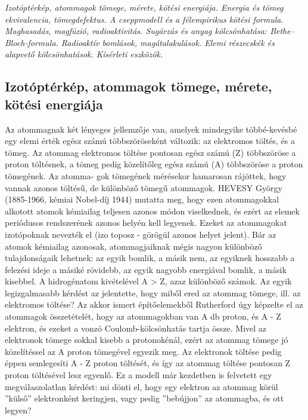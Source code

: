 \documentclass[../main.tex]{subfiles}
\begin{document}
\textit{Izotóptérkép, atommagok tömege, mérete, kötési energiája. Energia és tömeg ekvivalencia, tömegdefektus. A cseppmodell és a félempirikus kötési formula.
Maghasadás, magfúzió, radioaktivitás. Sugárzás és anyag kölcsönhatása: Bethe–Bloch-formula. Radioaktív bomlások, magátalakulások. Elemi részecskék és alapvető kölcsönhatások. Kísérleti eszközök.}

\subsection{Izotóptérkép, atommagok tömege, mérete, kötési energiája}
Az atommagnak két lényeges jellemzője van, amelyek mindegyike többé-kevésbé egy elemi érték egész számú többszöröseként változik: az elektromos töltés, és a tömeg. Az
atommag elektromos töltése pontosan egész számú (Z) többszöröse a proton töltésnek,
a tömeg pedig közelítőleg egész számú (A) többszöröse a proton tömegének. Az atomma-
gok tömegének mérésekor hamarosan rájöttek, hogy vannak azonos töltésű, de különböző
tömegű atommagok. HEVESY György (1885-1966, kémiai Nobel-díj 1944) mutatta meg,
hogy ezen atommagokkal alkotott atomok kémiailag teljesen azonos módon viselkednek,
és ezért az elemek periódusos rendszerének azonos helyén kell legyenek. Ezeket az atommagokat izotópoknak nevezték el (izo toposz - görögül azonos helyet jelent). Bár az
atomok kémiailag azonosak, atommagjaiknak mégis nagyon különböző tulajdonságaik
lehetnek: az egyik bomlik, a másik nem, az egyiknek hosszabb a felezési ideje a másiké rövidebb, az egyik nagyobb energiával bomlik, a másik kisebbel. A hidrogénatom
kivételével A > Z, azaz különböző számok. Az egyik legizgalmasabb kérdést az jelentette, hogy miből ered az atommag tömege, ill. az elektromos töltése? Az akkor ismert
építőelemekből Rutherford úgy képzelte el az atommagok összetételét, hogy az atommagokban van A db proton, és A - Z elektron, és ezeket a vonzó Coulomb-kölcsönhatás
tartja össze. Mivel az elektronok tömege sokkal kisebb a protonokénál, ezért az atommag
tömege jó közelítéssel az A proton tömegével egyezik meg. Az elektronok töltése pedig
éppen semlegesíti A - Z proton töltését, és így az atommag töltése pontosan Z proton
töltésével lesz egyenlő. Ez a modell már kezdetben is felvetett egy megválaszolatlan kérdést: mi dönti el, hogy egy elektron az atommag körül ”külső” elektronként keringjen,
vagy pedig ”bebújjon” az atommagba, és ott legyen?
\end{document}
